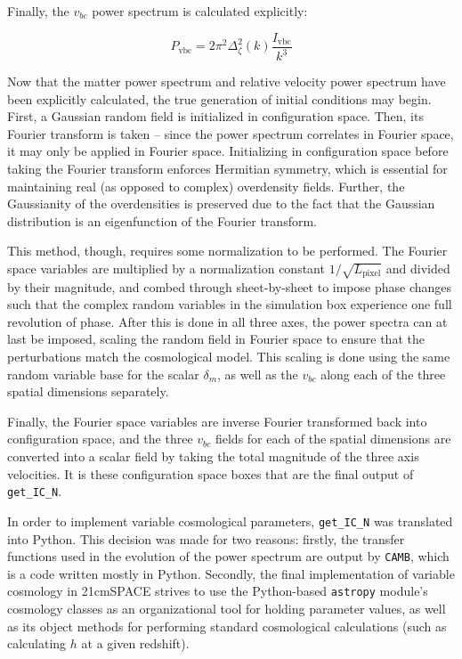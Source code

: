 \documentclass[floats,floatfix,showpacs,amssymb,prd,superscriptaddress,nofootinbib]{revtex4-2} %
\newcommand{\code}{\texttt}
\newcommand{\red}{\textcolor{red}}
\begin{document}
Finally, the $v_{bc}$ power spectrum is calculated explicitly:

\begin{equation}
    P_{\text{vbc}} = 2 \pi^2 \Delta_\zeta ^2 (k) \frac{I_{\text{vbc}}}{k^3}
\end{equation}

Now that the matter power spectrum and relative velocity power spectrum have been explicitly calculated, the true generation of initial conditions may begin. First, a Gaussian random field is initialized in configuration space. Then, its Fourier transform is taken -- since the power spectrum correlates in Fourier space, it may only be applied in Fourier space. Initializing in configuration space before taking the Fourier transform enforces Hermitian symmetry, which is essential for maintaining real (as opposed to complex) overdensity fields. Further, the Gaussianity of the overdensities is preserved due to the fact that the Gaussian distribution is an eigenfunction of the Fourier transform. 

This method, though, requires some normalization to be performed. The Fourier space variables are multiplied by a normalization constant $1 / \sqrt{L_{\text{pixel}}}$ and divided by their magnitude, and combed through 
sheet-by-sheet to impose phase changes such that the complex random variables in the simulation box experience one full revolution of phase. After this is done in all three axes, the power spectra can at last be imposed, scaling the random field in Fourier space to ensure that the perturbations match the cosmological model. This scaling is done using the same random variable base for the scalar $\delta_m$, as well as the $v_{bc}$ along each of the three spatial dimensions separately.

Finally, the Fourier space variables are inverse Fourier transformed back into configuration space, and the three $v_{bc}$ fields for each of the spatial dimensions are converted into a scalar field by taking the total magnitude of the three axis velocities. It is these configuration space boxes that are the final output of \code{get\_IC\_N}.

In order to implement variable cosmological parameters, \code{get\_IC\_N} was translated into Python. This decision was made for two reasons: firstly, the transfer functions used in the evolution of the power spectrum are output by \code{CAMB}, which is a code written mostly in Python. Secondly, the final implementation of variable cosmology in 21cmSPACE strives to use the Python-based \code{astropy} module's cosmology classes as an organizational tool for holding parameter values, as well as its object methods for performing standard cosmological calculations (such as calculating $h$ at a given redshift). 
\end{document}
